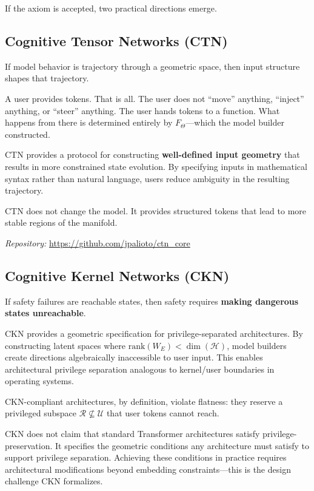 \documentclass[11pt]{article}
\theoremstyle{definition}
\theoremstyle{remark}
\begin{document}
If the axiom is accepted, two practical directions emerge.

\subsection{Cognitive Tensor Networks (CTN)}

If model behavior is trajectory through a geometric space, then input structure shapes that trajectory.

A user provides tokens. That is all. The user does not ``move'' anything, ``inject'' anything, or ``steer'' anything. The user hands tokens to a function. What happens from there is determined entirely by $F_\Theta$---which the model builder constructed.

CTN provides a protocol for constructing \textbf{well-defined input geometry} that results in more constrained state evolution. By specifying inputs in mathematical syntax rather than natural language, users reduce ambiguity in the resulting trajectory.

CTN does not change the model. It provides structured tokens that lead to more stable regions of the manifold.

\smallskip
\noindent\textit{Repository:} \url{https://github.com/jpalioto/ctn_core}

\subsection{Cognitive Kernel Networks (CKN)}

If safety failures are reachable states, then safety requires \textbf{making dangerous states unreachable}.

CKN provides a geometric specification for privilege-separated architectures. By constructing latent spaces where $\text{rank}(W_E) < \dim(\mathcal{H})$, model builders create directions algebraically inaccessible to user input. This enables architectural privilege separation analogous to kernel/user boundaries in operating systems.

CKN-compliant architectures, by definition, violate flatness: they reserve a privileged subspace $\mathcal{R} \not\subseteq \mathcal{U}$ that user tokens cannot reach.

CKN does not claim that standard Transformer architectures satisfy privilege-preservation. It specifies the geometric conditions any architecture must satisfy to support privilege separation. Achieving these conditions in practice requires architectural modifications beyond embedding constraints---this is the design challenge CKN formalizes.
\end{document}
